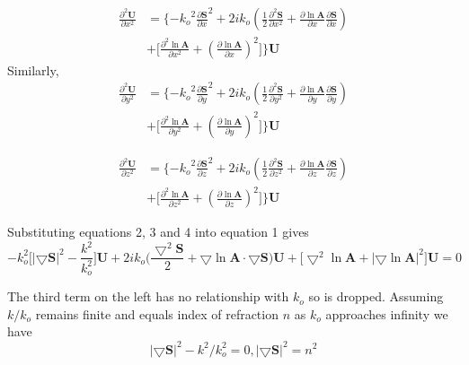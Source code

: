 \documentclass[24 pts]{article}
\begin{document}
\begin{equation}
\begin{split}
\frac{\partial ^2\mathbf{U} }{\partial x^2}&=\bigg\{{-k_o}^2{\frac{\partial \mathbf{S} }{\partial x} }^2+ 2ik_o(\frac{1}{2}\frac{\partial ^2\mathbf{S}}{\partial x^2}+\frac{\partial \ln \mathbf{A}}{\partial x}\frac{\partial \mathbf{S}}{\partial x})\\
&+ \Big[ \frac{\partial ^2\ln \mathbf{A}}{\partial x^2}+ {(\frac{\partial \ln \mathbf{A}}{\partial x})}^2\Big]\bigg\}\mathbf{U}
\end{split}
\end{equation}
Similarly,
\begin{equation}
\begin{split}
\frac{\partial ^2\mathbf{U} }{\partial y^2}&=\bigg\{{-k_o}^2{\frac{\partial \mathbf{S} }{\partial y} }^2+ 2ik_o(\frac{1}{2}\frac{\partial ^2\mathbf{S}}{\partial y^2}+\frac{\partial \ln \mathbf{A}}{\partial y}\frac{\partial \mathbf{S}}{\partial y})\\
&+ \Big[ \frac{\partial ^2\ln \mathbf{A}}{\partial y^2}+ {(\frac{\partial \ln \mathbf{A}}{\partial y})}^2\Big]\bigg\}\mathbf{U}
\end{split}
\end{equation}

\begin{equation}
\begin{split}
\frac{\partial ^2\mathbf{U} }{\partial z^2}&=\bigg\{{-k_o}^2{\frac{\partial \mathbf{S} }{\partial z} }^2+ 2ik_o(\frac{1}{2}\frac{\partial ^2\mathbf{S}}{\partial z^2}+\frac{\partial \ln \mathbf{A}}{\partial z}\frac{\partial \mathbf{S}}{\partial z})\\
&+ \Big[ \frac{\partial ^2\ln \mathbf{A}}{\partial z^2}+ {(\frac{\partial \ln \mathbf{A}}{\partial z})}^2\Big]\bigg\}\mathbf{U}
\end{split}
\end{equation}

Substituting equations 2, 3 and 4 into equation 1 gives
\begin{equation}
-k_o^2\Big[|\bigtriangledown \mathbf{S}|^2 -\frac{k^2}{k_o^2}\Big]\mathbf{U}+2ik_o\bigg(\frac{\bigtriangledown^2 \mathbf{S}}{2} + \bigtriangledown \ln\mathbf{A}\cdotp \bigtriangledown\mathbf{S}  \bigg)\mathbf{U}+\Big[\bigtriangledown ^2\ln\mathbf{A}+|\bigtriangledown \ln\mathbf{A}|^2\Big]\mathbf{U}=0
\end{equation}

The third term on the left has no relationship with $k_o$ so is dropped. Assuming $k/k_o$ remains finite and equals index of refraction $n$ as $k_o$ approaches infinity we have
$$ |\bigtriangledown\mathbf{S}|^2 - k^2/k_o^2 =0,  |\bigtriangledown\mathbf{S}|^2 =n^2 $$
\end{document}
